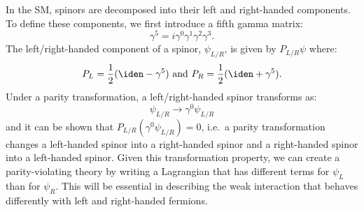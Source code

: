 In the SM, spinors are decomposed into their left and right-handed components. To define these components, we first introduce a fifth gamma matrix:
\begin{equation}
  \gamma^5 = i\gamma^0 \gamma^1 \gamma^2 \gamma^3 .
\end{equation}
The left/right-handed component of a spinor, $\psi_{L/R}$, is given by $P_{L/R} \psi$ where:
\begin{equation}
  P_L = \frac{1}{2} (\iden - \gamma^5) \text{ and } P_R = \frac{1}{2}(\iden + \gamma^5) .
\end{equation}
Under a parity transformation, a left/right-handed spinor transforms as:
\begin{equation}
  \psi_{L/R} \to \gamma^0 \psi_{L/R}
\end{equation}
and it can be shown that $P_{L/R} (\gamma^0 \psi_{L/R}) = 0$, i.e.\ a parity transformation changes a left-handed spinor into a right-handed spinor and a right-handed spinor into a left-handed spinor. Given this transformation property, we can create a parity-violating theory by writing a Lagrangian that has different terms for $\psi_L$ than for $\psi_R$. This will be essential in describing the weak interaction that behaves differently with left and right-handed fermions.


